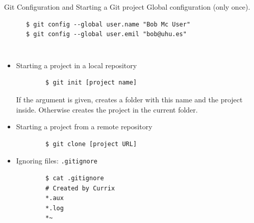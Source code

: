 \begin{frame}[t,fragile]{Git Configuration and Starting a Git project}
    \alert{Global configuration} (only once).
    \begin{lstlisting}
      $ git config --global user.name "Bob Mc User"
      $ git config --global user.emil "bob@uhu.es"
    \end{lstlisting}%

  \begin{columns}
    {\scriptsize
      \begin{itemize}
      \item \alert{Starting} a project in a \alert{local} repository
      \begin{lstlisting}
        $ git init [project name]
      \end{lstlisting}

      If the argument is given, creates a folder with this name and the project inside. Otherwise creates the project in the current folder.
      
      \item \alert{Starting} a project from a \alert{remote} repository
      \begin{lstlisting}
        $ git clone [project URL]
      \end{lstlisting}
    \item \alert{Ignoring} files: \texttt{.gitignore}
      \begin{lstlisting}
        $ cat .gitignore
        # Created by Currix
        *.aux
        *.log
        *~
       \end{lstlisting}
      

\end{itemize}}
\end{columns}
\end{frame}
